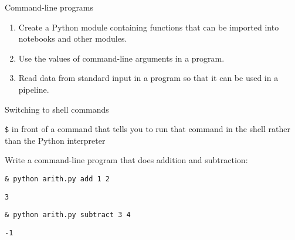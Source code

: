 \documentclass{beamer}
\begin{document}

\begin{frame}{Command-line programs}

\begin{enumerate}
    \item{Create a Python module containing functions that can be imported into notebooks and other modules.}
    \item{Use the values of command-line arguments in a program.}
    \item{Read data from standard input in a program so that it can be used in a pipeline.}
\end{enumerate}
\end{frame}



\begin{frame}{Switching to shell commands}

 \textcolor{verde}{\texttt{\$}} in front of a command that tells you to run that command in the shell rather than the Python interpreter
%

\end{frame}


\begin{frame}{ }
Write a command-line program that does addition and subtraction:
\vspace{0.5cm}

\begin{beamerboxesrounded}[upper=uppercolgreen,lower=lowercolgreen,shadow=false]{}
\texttt{\& python arith.py add 1 2 }
\end{beamerboxesrounded}

\begin{beamerboxesrounded}[upper=uppercolgreen,lower=lowercolgreen,shadow=false]{}
\texttt{3}
\end{beamerboxesrounded}

\begin{beamerboxesrounded}[upper=uppercolgreen,lower=lowercolgreen,shadow=false]{}
\texttt{\& python arith.py subtract 3 4 }
\end{beamerboxesrounded}

\begin{beamerboxesrounded}[upper=uppercolgreen,lower=lowercolgreen,shadow=false]{}
\texttt{-1}
\end{beamerboxesrounded}


\end{frame}
\end{document}
